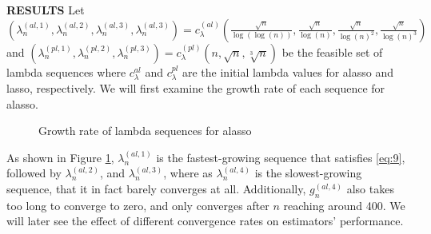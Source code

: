 \documentclass[12pt,a4paper]{article}
\begin{document}
\textbf{RESULTS} Let $ (\lambda_n^{(al, 1)}, \lambda_n^{(al, 2)}, \lambda_n^{(al, 3)}, \lambda_n^{(al, 3)}) =  c_\lambda^{(al)}\left(\frac{\sqrt{n}}{\log(\log(n))}, \frac{\sqrt{n}}{\log(n)}, \frac{\sqrt{n}}{\log(n)^2}, \frac{\sqrt{n}}{\log(n)^3}\right)$ and $ (\lambda_n^{(pl, 1)}, \lambda_n^{(pl, 2)}, \lambda_n^{(pl, 3)}) = c_\lambda^{(pl)}(n, \sqrt{n}, \sqrt[3]{n}) $ be the feasible set of lambda sequences where $ c_\lambda^{al} $ and $ c_\lambda^{pl} $ are the initial lambda values for alasso and lasso, respectively. We will first examine the growth rate of each sequence for alasso. 

\begin{figure}[!ht]
	\begin{center}
		\caption{Growth rate of lambda sequences for alasso}
		\label{fig:1} 
		\scalebox{0.92}{}
	\end{center}
\end{figure}

As shown in Figure \ref{fig:1}, $ \lambda_n^{(al, 1)} $ is the fastest-growing sequence that satisfies \eqref{eq:9}, followed by $ \lambda_n^{(al, 2)} $, and $ \lambda_n^{(al, 3)} $, where as $ \lambda_n^{(al, 4)} $ is the slowest-growing sequence, that it in fact barely converges at all. Additionally, $ g_n^{(al, 4)} $ also takes too long to converge to zero, and only converges after $ n $ reaching around 400. We will later see the effect of different convergence rates on estimators' performance. 
\end{document}
